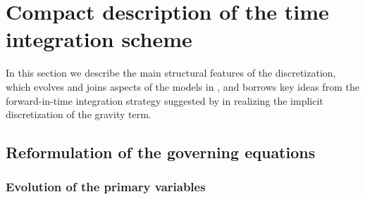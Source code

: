 \documentclass{ametsoc}
\theoremstyle{definition}
\begin{document}

\section{Compact description of the time integration scheme}
\label{sec:TimeDiscretizationSummary}

In this section we describe the main structural features of the discretization, which evolves and joins aspects of the models in \citet{KleinTCFD2009,BenacchioEtAl2014}, and borrows key ideas from the forward-in-time integration strategy suggested by \citet{SmolarkiewiczMargolin1993, SmolarkiewiczMargolin1997} in realizing the implicit discretization of the gravity term. 


\subsection{Reformulation of the governing equations}
\label{ssec:Reformulation}


\subsubsection{Evolution of the primary variables}
\label{sssec:PrimaryVariables}
\end{document}
